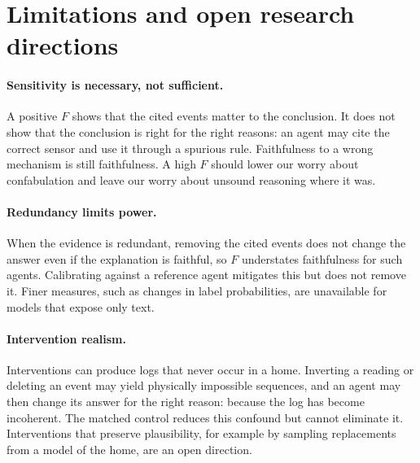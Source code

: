 \documentclass[11pt,a4paper]{article}
\begin{document}
\section{Limitations and open research directions}
\label{sec:limits}

\paragraph{Sensitivity is necessary, not sufficient.} A positive $F$ shows that the cited events matter to the conclusion. It does not show that the conclusion is right for the right reasons: an agent may cite the correct sensor and use it through a spurious rule. Faithfulness to a wrong mechanism is still faithfulness. A high $F$ should lower our worry about confabulation and leave our worry about unsound reasoning where it was.

\paragraph{Redundancy limits power.} When the evidence is redundant, removing the cited events does not change the answer even if the explanation is faithful, so $F$ understates faithfulness for such agents. Calibrating against a reference agent mitigates this but does not remove it. Finer measures, such as changes in label probabilities, are unavailable for models that expose only text.

\paragraph{Intervention realism.} Interventions can produce logs that never occur in a home. Inverting a reading or deleting an event may yield physically impossible sequences, and an agent may then change its answer for the right reason: because the log has become incoherent. The matched control reduces this confound but cannot eliminate it. Interventions that preserve plausibility, for example by sampling replacements from a model of the home, are an open direction.
\end{document}
